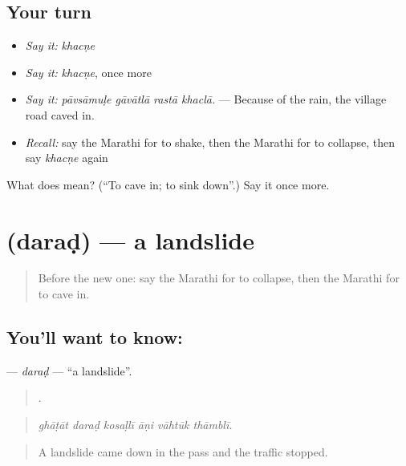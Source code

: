 \subsection*{Your turn}
\begin{itemize}
\raggedright
  \item \emph{Say it:} \emph{khacṇe}
  \item \emph{Say it:} \emph{khacṇe}, once more
  \item \emph{Say it:} \emph{pāvsāmuḷe gāvātlā rastā khaclā.} — Because of the rain, the village road caved in.
  \item \emph{Recall:} say the Marathi for to shake, then the Marathi for to collapse, then say \emph{khacṇe} again
\end{itemize}

\begin{tcolorbox}[breakable,colback=teal!4,colframe=teal!35!black,title={Before you move on}]
What does  mean? (\textquotedblleft{}To cave in; to sink down\textquotedblright{}.) Say it once more.
\end{tcolorbox}
\section[\texorpdfstring{\mr{दरड} (daraḍ)}{दरड (daraḍ)}]{ (daraḍ) — a landslide}

\label{lesson:MR-C293-darad}



\begin{quote}
Before the new one: say the Marathi for to collapse, then the Marathi for to cave in.
\end{quote}

\subsection*{You'll want to know: }
\textbf{} — \emph{daraḍ} — \textquotedblleft{}a landslide\textquotedblright{}.

\begin{quote}
     .
\end{quote}

\begin{quote}
\emph{ghāṭāt daraḍ kosaḷlī āṇi vāhtūk thāmblī.}
\end{quote}

\begin{quote}
A landslide came down in the pass and the traffic stopped.
\end{quote}


